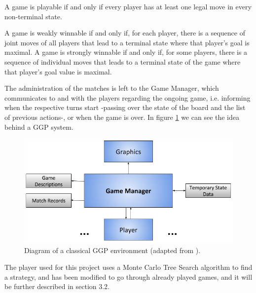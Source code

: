 \begin{definition}[Playability]
\label{def:playable}
A game is playable if and only if every player has at least one legal move in every non-terminal state.
\end{definition}
\begin{definition}[Winnability]
\label{def:winnable}
A game is weakly winnable if and only if, for each player, there is a sequence of joint moves of all players that lead to a terminal state where that player's goal is maximal. A game is strongly winnable if and only if, for some players, there is a sequence of individual moves that leads to a terminal state of the game where that player's goal value is maximal.
\end{definition}
The administration of the matches is left to the Game Manager, which communicates to and with the players regarding the ongoing game, i.e. informing when the respective turns start -passing over the state of the board and the list of previous actions-, or when the game is over. In figure \ref{fig:GGP} we can see the idea behind a GGP system\cite{genesereth2014general}.\\
\begin{figure}[H]
\centering
\includegraphics[scale=0.4]{figure/GGP2}
\caption{Diagram of a classical GGP environment (adapted from \cite{genesereth2014general}).}
\label{fig:GGP}
\end{figure}
The player used for this project uses a Monte Carlo Tree Search algorithm to find a strategy, and has been modified to go through already played games, and it will be further described in section 3.2.\\
